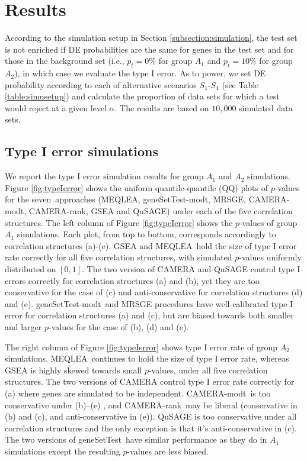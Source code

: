 \documentclass[useAMS,usenatbib, galley]{biom}
\newcommand{\OurMethod}{MEQLEA}
\newcommand{\aaCase}{a}
\newcommand{\aCase}{b}
\newcommand{\cCase}{c}
\newcommand{\eCase}{d}
\newcommand{\fCase}{e}
\newcommand{\CMR}{CAMERA-rank}
\newcommand{\CMT}{CAMERA-modt}
\newcommand{\gent}{geneSetTest-modt}
\newcommand{\gen}{geneSetTest}
\begin{document}
	
	\section{Results}\label{section:results}
	
	According to the simulation setup in Section \ref{subsection:simulation}, the test set is not enriched if DE probabilities are the same for genes in the test set and for those in the background set (i.e., $p_t =0\%$ for group $A_1$ and $p_t = 10\%$ for group $A_2$), in which case we evaluate the type I error. As to power, we set DE probability according to each of alternative scenarios $S_1$-$S_4$ (see Table \ref{table:simusetup}) and calculate the proportion of data sets for which a test would reject at a given level $\alpha$. The results are based on $10,000$ simulated data sets. 
		
		

	\subsection{Type I error simulations}\label{subsection:typeIerror}

	We report the type I error simulation results for group $A_1$ and $A_2$ simulations. Figure \ref{fig:typeIerror} shows the uniform quantile-quantile (QQ) plots of $p$-values for the seven~approaches (\OurMethod, \gent, MRSGE, \CMT, \CMR, GSEA and QuSAGE) under each of the five correlation structures. The left column of Figure \ref{fig:typeIerror} shows the $p$-values of group $A_1$ simulations. Each plot, from top to bottom, corresponds accordingly to correlation structures (\aaCase)-(\fCase). GSEA and \OurMethod~hold the size of type I error rate correctly for all five correlation structures, with simulated $p$-values uniformly distributed on $[0, 1]$. The two version of CAMERA and QuSAGE control type I errors correctly for correlation structures (\aaCase) and (\aCase), yet they are too conservative for the case of (\cCase) and anti-conservative for correlation structures (\eCase) and (\fCase). \gent~and MRSGE procedures have well-calibrated type I error for correlation structures (\aaCase) and (\cCase), but are biased towards both smaller and larger $p$-values for the case of (\aCase), (\eCase) and (\fCase). 
	
	The right column of Figure \ref{fig:typeIerror} shows type I error rate of group $A_2$ simulations. \OurMethod~continues to hold the size of type I error rate, whereas GSEA is highly skewed towards small $p$-values, under all five correlation structures. The two versions of CAMERA control type I error rate correctly for (\aaCase) where genes are simulated to be independent. \CMT~is too conservative under (\aCase)--(\fCase) , and \CMR~may be liberal (conservative in (\aCase) and (\cCase), and anti-conservative in (\fCase)). QuSAGE is too conservative under all correlation structures and the only exception is that it's anti-conservative in (\cCase). The two versions of \gen~have similar performance as they do in $A_1$ simulations except the resulting $p$-values are less biased.
	
\end{document}
